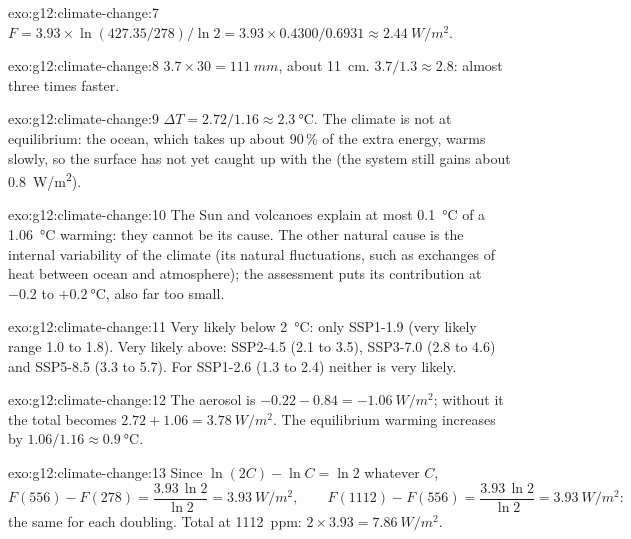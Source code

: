 \begin{solution}{exo:g12:climate-change:7}
$F = 3.93 \times \ln(427.35/278)/\ln 2 = 3.93 \times 0.4300/0.6931 \approx
\qty{2.44}{W/m^2}$.
\end{solution}

\begin{solution}{exo:g12:climate-change:8}
$3.7 \times 30 = \qty{111}{mm}$, about \qty{11}{cm}. $3.7/1.3 \approx 2.8$:
almost three times faster.
\end{solution}

\begin{solution}{exo:g12:climate-change:9}
$\Delta T = 2.72/1.16 \approx \qty{2.3}{\degreeCelsius}$. The climate is not
at equilibrium: the ocean, which takes up about 90\,\% of the extra energy,
warms slowly, so the surface has not yet caught up with the  (the
system still gains about \qty{0.8}{W/m^2}).
\end{solution}

\begin{solution}{exo:g12:climate-change:10}
The Sun and volcanoes explain at most \qty{0.1}{\degreeCelsius} of a
\qty{1.06}{\degreeCelsius} warming: they cannot be its cause. The other
natural cause is the internal variability of the climate (its natural
fluctuations, such as exchanges of heat between ocean and atmosphere); the
assessment puts its contribution at $-0.2$ to $+\qty{0.2}{\degreeCelsius}$,
also far too small.
\end{solution}

\begin{solution}{exo:g12:climate-change:11}
Very likely below \qty{2}{\degreeCelsius}: only SSP1-1.9 (very likely range
1.0 to 1.8). Very likely above: SSP2-4.5 (2.1 to 3.5), SSP3-7.0 (2.8 to 4.6)
and SSP5-8.5 (3.3 to 5.7). For SSP1-2.6 (1.3 to 2.4) neither is very likely.
\end{solution}

\begin{solution}{exo:g12:climate-change:12}
The aerosol  is $-0.22 - 0.84 = \qty{-1.06}{W/m^2}$; without it the
total becomes $2.72 + 1.06 = \qty{3.78}{W/m^2}$. The equilibrium warming
increases by $1.06/1.16 \approx \qty{0.9}{\degreeCelsius}$.
\end{solution}

\begin{solution}{exo:g12:climate-change:13}
Since $\ln(2C) - \ln C = \ln 2$ whatever $C$,
\[
  F(556) - F(278) = \frac{3.93\,\ln 2}{\ln 2} = \qty{3.93}{W/m^2}, \qquad
  F(1112) - F(556) = \frac{3.93\,\ln 2}{\ln 2} = \qty{3.93}{W/m^2}:
\]
the same  for each doubling. Total at \qty{1112}{ppm}: $2 \times 3.93 =
\qty{7.86}{W/m^2}$.
\end{solution}

